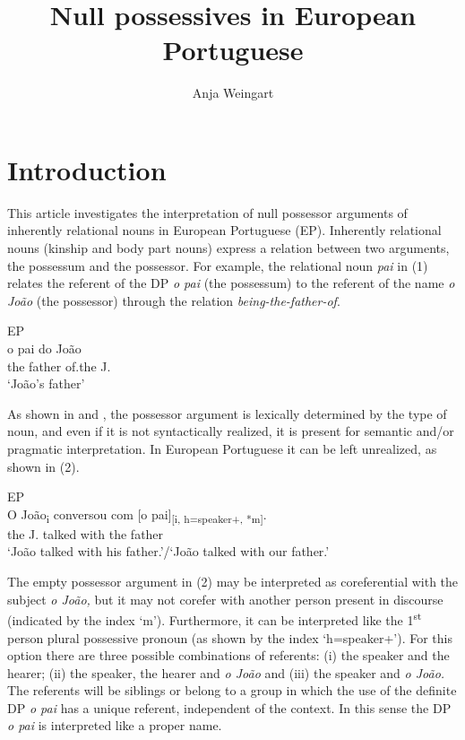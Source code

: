 \documentclass[output=paper]{langsci/langscibook}
\author{Anja Weingart\affiliation{Georg-August-Universität Göttingen}}
\title{Null possessives in European Portuguese}
\begin{document}
\section{Introduction}%

This article investigates the interpretation of null possessor arguments of inherently relational nouns in European Portuguese (EP). Inherently relational nouns (kinship and body part nouns) express a relation between two arguments, the possessum and the possessor. For example, the relational noun \textit{pai} in (1) relates the referent of the DP \textit{o pai} (the possessum) to the referent of the name \textit{o João} (the possessor) through the relation \textit{being-the-father-of}.

\ea%
         EP\label{ex:wein:1}\\
    \gll o   pai   do   João\\
         the   father of.the   J.\\
    \glt ‘João’s father’
    \z


As shown in \citet{Barker2011} and \citet{Löbner2011}, the possessor argument is lexically determined by the type of noun, and even if it is not syntactically realized, it is present for semantic and\slash or pragmatic interpretation. In European Portuguese it can be left unrealized, as shown in (2).

\ea%
         EP\label{ex:wein:2}\\
    \gll O  João\textsubscript{i}   conversou     com [o   pai]\textsubscript{[i, h=speaker+, *m]}.\\
         the J.     talked   with the father\\
    \glt ‘João talked with his father.’\slash ‘João talked with our father.’
\z

The empty possessor argument in (2) may be interpreted as coreferential with the subject \textit{o João,} but it may not corefer with another person present in discourse (indicated by the index ‘m’). Furthermore, it can be interpreted like the 1\textsuperscript{st} person plural possessive pronoun (as shown by the index ‘h=speaker+’). For this option there are three possible combinations of referents: (i) the speaker and the hearer; (ii) the speaker, the hearer and \textit{o João} and (iii) the speaker and \textit{o João.} The referents will be siblings or belong to a group in which the use of the definite DP \textit{o pai} has a unique referent, independent of the context. In this sense the DP \textit{o pai} is interpreted like a proper name.
\end{document}
